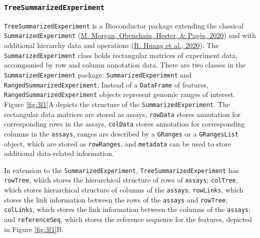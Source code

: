 \documentclass[12pt,twoside]{reedthesis}
\begin{document}
\hypertarget{treesummarizedexperiment}{%
\subsubsection{\texorpdfstring{\texttt{TreeSummarizedExperiment}}{TreeSummarizedExperiment}}\label{treesummarizedexperiment}}

\texttt{TreeSummarizedExperiment} is a Bioconductor package extending the
classical \texttt{SummarizedExperiment} (\protect\hyperlink{ref-morgan2020}{M. Morgan, Obenchain, Hester, \& Pagès, 2020}) and with additional
hierarchy data and operations (\protect\hyperlink{ref-huang2020}{R. Huang et al., 2020}). The \texttt{SummarizedExperiment}
class holds rectangular matrices of experiment data, accompanied by row
and column annotation data. There are two classes in the
\texttt{SummarizedExperiment} package: \texttt{SummarizedExperiment} and
\texttt{RangedSummarizedExperiment}. Instead of a \texttt{DataFrame} of features,
\texttt{RangedSummarizedExperiment} objects represent genomic ranges of
interest. Figure \ref{fig:3f1}A depicts the structure of the
\texttt{SummarizedExperiment}. The rectangular data matrices are stored as
assays, \texttt{rowData} stores annotation for corresponding rows in the
assays, \texttt{colData} stores annotation for corresponding columns in the
\texttt{assays}, ranges are described by a \texttt{GRanges} or a \texttt{GRangesList} object,
which are stored as \texttt{rowRanges}, and \texttt{metadata} can be used to store
additional data-related information.

In extension to the \texttt{SummarizedExperiment}, \texttt{TreeSummarizedExperiment}
has \texttt{rowTree}, which stores the hierarchical structure of rows of
\texttt{assays}; \texttt{colTree}, which stores hierarchical structure of columns of
the \texttt{assays}; \texttt{rowLinks}, which stores the link information between the
rows of the \texttt{assays} and \texttt{rowTree}; \texttt{colLinks}, which stores the link
information between the columns of the \texttt{assays}; and \texttt{referenceSeq},
which stores the reference sequence for the features, depicted in Figure
\ref{fig:3f1}B.
\end{document}
